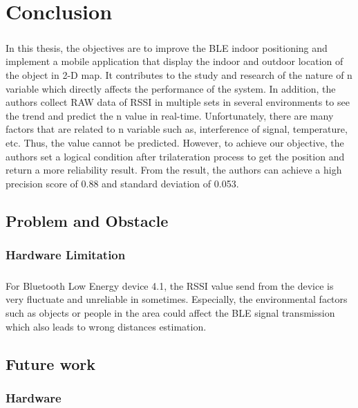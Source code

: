\chapter{Conclusion}
\paragraph{}In this thesis, the objectives are to improve the BLE indoor positioning and implement a mobile application that display the indoor and outdoor location of the object in 2-D map. It contributes to the study and research of the nature of n variable which directly affects the performance of the system. In addition, the authors collect RAW data of RSSI in multiple sets in several environments to see the trend and predict the n value in real-time. Unfortunately, there are many factors that are related to n variable such as, interference of signal, temperature, etc. Thus, the value cannot be predicted. However, to achieve our objective, the authors set a logical condition after trilateration process to get the position and return a more reliability result. From the result, the authors can achieve a high precision score of 0.88 and  standard deviation of 0.053.
\section{Problem and Obstacle}
\paragraph{}
\subsection{Hardware Limitation}
\paragraph{}For Bluetooth Low Energy device 4.1, the  RSSI value send from the device is very fluctuate and unreliable in sometimes. Especially, the environmental factors such as objects or people in the area could  affect the BLE signal transmission which also leads to wrong distances estimation.

\section{Future work}
\subsection{Hardware}
